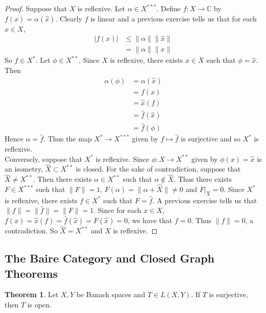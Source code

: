 \documentclass[12pt]{amsart}
\theoremstyle{definition}
\newtheorem{thm}[definition]{Theorem}
\newcommand{\al}{\alpha}
\newcommand{\C}{\mathbb{C}}
\begin{document}
	\begin{proof}
		Suppose that $X$ is reflexive. Let $\al \in X^{***}$. Define $f :X \rightarrow \C$ by $f(x) = \al(\hat{x})$. Clearly $f$ is linear and a previous exercise tells us that for each $x \in X$, 
		\begin{align*}
			\vert f(x) \vert 
			& \leq \|\al \|\|\hat{x} \|\\
			&= \|\al \|\|x \|
		\end{align*}
		So $f \in X^*$.
		Let $\phi \in X^{**}$. Since $X$ is reflexive, there exists $x \in X$ such that $\phi = \hat{x}$. Then 
		\begin{align*}
			\al(\phi)
			&= \al(\hat{x})\\
			&= f(x)\\
			&= \hat{x}(f)\\
			&= \hat{f}(\hat{x})\\
			&= \hat{f}(\phi)
		\end{align*}
		Hence $\al = \hat{f}$. Thus the map $X^* \rightarrow X^{***}$ given by $f \mapsto \hat{f} $ is surjective and so $X^{*}$ is reflexive.\vspace{.5cm}\\
		Conversely, suppose that $X^*$ is reflexive. Since $\phi:X \rightarrow X^{**}$ given by $\phi(x) = \hat{x}$ is an isometry, $\widehat{X} \subset X^{**}$ is closed. For the sake of contradiction, suppose that $\widehat{X} \neq X^{**}$. Then there exists $\al \in X^{**}$ such that $\al \not \in \widehat{X}$. Thus there exists $F \in X^{***}$ such that $\|F \|= 1$, $F(\al) = \|\al + \widehat{X} \|\neq 0$ and $F|_{\widehat{X}}=0$. Since $X^*$ is reflexive, there exists $f \in X^*$ such that $F = \hat{f}$. A previous exercise tells us that $\|f \|= \|\hat{f} \|= \|F \|= 1$. Since for each $x \in X$, $f(x) = \hat{x}(f) = \hat{f}(\hat{x}) = F(\hat{x}) = 0$, we have that $f = 0$. Thus $\|f \|= 0$, a contradiction. So $\widehat{X} = X^{**}$ and $X$ is reflexive.
		
	\end{proof}
	
	\newpage
	
	\subsection{The Baire Category and Closed Graph Theorems}
	
	\begin{thm}
		Let $X, Y$ be Banach spaces and $T\in L(X,Y)$. If $T$ is surjective, then $T$ is open.
	\end{thm}
	
\end{document}
